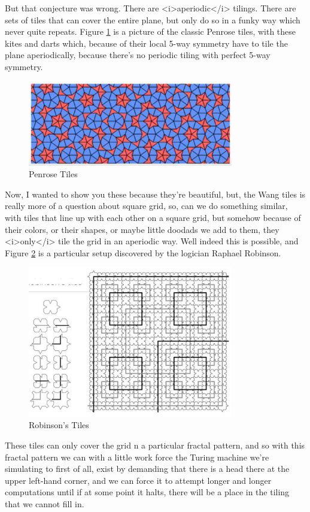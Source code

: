 \documentclass[]{article}
\begin{document}
But that conjecture was wrong.
There are <i>aperiodic</i> tilings.
There are sets of tiles that can cover
the entire plane,
but only do so
in a funky way
which never quite repeats.
Figure \ref{fig:aperiodic} is a picture
of the classic Penrose tiles,
with these kites and darts
which, because of their local
5-way symmetry
have to tile the plane aperiodically,
because there's no periodic tiling
with perfect 5-way symmetry.
\begin{figure}[H]
	\begin{center}
		\caption{Penrose Tiles}\label{fig:aperiodic}
		\includegraphics[width=0.8\textwidth]{aperiodic}
	\end{center}
\end{figure}
Now, I wanted to show you these
because they're beautiful,
but,
the Wang tiles is really more of
a question about square grid,
so, can we do something similar,
with tiles that line up with each other
on a square grid,
but somehow because of their colors,
or their shapes,
or maybe little doodads we add to them,
they <i>only</i> tile the grid
in an aperiodic way.
Well indeed this is possible,
and Figure \ref{fig:robinsons} is a particular setup
discovered by the logician
Raphael Robinson.

\begin{figure}[H]
	\begin{center}
		\caption{Robinson's Tiles}\label{fig:robinsons}
		\includegraphics[width=0.8\textwidth]{robinsons}
	\end{center}
\end{figure}
These tiles can only cover the grid
n a particular fractal pattern,
and so with this fractal pattern
we can with a little work
force
the Turing machine we're simulating
to first of all, exist
by demanding that there is a head
there at the upper left-hand corner,
and we can force it to attempt
longer and longer computations
until if at some point it halts,
there will be a place in the tiling
that we cannot fill in.
\end{document}
